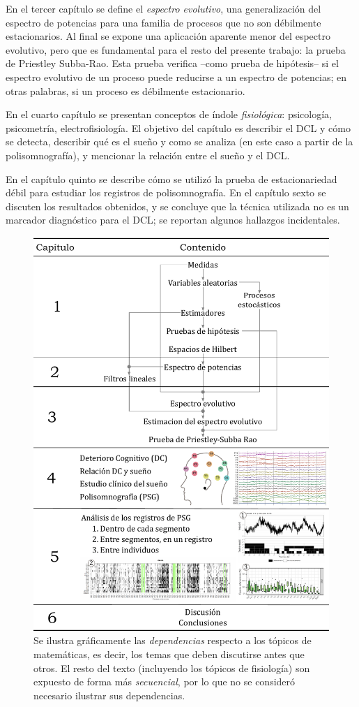 En el tercer capítulo se define el \textit{espectro evolutivo}, una generalización del espectro de potencias para una familia de procesos que no son débilmente estacionarios.
%
Al final se expone una aplicación aparente menor del espectro evolutivo, pero que es fundamental para el resto del presente trabajo: la prueba de Priestley Subba-Rao. 
%
Esta prueba verifica --como prueba de hipótesis-- si el espectro evolutivo de un proceso puede reducirse a un espectro de potencias; en otras palabras, si un proceso es débilmente estacionario.

En el cuarto capítulo se presentan conceptos de índole \textit{fisiológica}: psicología, psicometría, electrofisiología.
%
El objetivo del capítulo es describir el DCL y cómo se detecta, describir qué es el sueño y como se analiza (en este caso a partir de la polisomnografía), y mencionar la relación entre el sueño y el DCL.

En el capítulo quinto se describe cómo se utilizó la prueba de estacionariedad débil para estudiar los registros de polisomnografía.
%
En el capítulo sexto se discuten los resultados obtenidos, y se concluye que la técnica utilizada no es un marcador diagnóstico para el DCL; se reportan algunos hallazgos incidentales.

\begin{figure}
\centering
\includegraphics[width=.9\textwidth]{./estructura_texto_v2.pdf}
\caption[Estructura de la tesis]{Se ilustra gráficamente las \textit{dependencias} respecto a los tópicos de matemáticas, es decir, los temas que deben discutirse antes que otros. El resto del texto (incluyendo los tópicos de fisiología) son expuesto de forma más \textit{secuencial}, por lo que no se consideró necesario ilustrar sus dependencias.}
\label{intro:estructura}
\end{figure}

